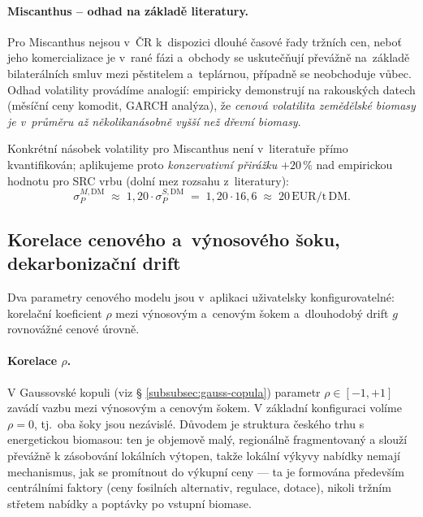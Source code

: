 \paragraph{Miscanthus -- odhad na základě literatury.}
Pro Miscanthus nejsou v~ČR k~dispozici dlouhé časové řady tržních cen,
neboť jeho komercializace je v~rané fázi a~obchody se uskutečňují
převážně na~základě bilaterálních smluv mezi pěstitelem a~teplárnou, případně se neobchoduje vůbec.
Odhad volatility provádíme analogií: \citet{Kristoefel2014} empiricky
demonstrují na rakouských datech (měsíční ceny komodit, GARCH analýza),
že \emph{cenová volatilita zemědělské biomasy je v~průměru až několikanásobně
vyšší než dřevní biomasy}.

Konkrétní násobek volatility pro Miscanthus není v~literatuře přímo
kvantifikován; aplikujeme proto \emph{konzervativní přirážku}
$+20\,\%$ nad empirickou hodnotu pro SRC vrbu (dolní mez rozsahu z~literatury):
\begin{equation}
\sigma_P^{M,\mathrm{DM}} \;\approx\; 1{,}20 \cdot \sigma_P^{S,\mathrm{DM}}
\;=\; 1{,}20 \cdot 16,6 \;\approx\; 20\,\mathrm{EUR/t\,DM}.
\label{eq:sigma_M}
\end{equation}



\subsection{Korelace cenového a~výnosového šoku, dekarbonizační drift}
\label{sec:korelace_drift}

Dva parametry cenového modelu jsou v~aplikaci uživatelsky
konfigurovatelné: korelační koeficient $\rho$ mezi výnosovým
a~cenovým šokem a~dlouhodobý drift $g$ rovnovážné cenové úrovně.

\paragraph{Korelace $\rho$.}
V Gaussovské kopuli (viz § \ref{subsubsec:gauss-copula}) parametr $\rho \in [-1, +1]$ 
zavádí vazbu mezi výnosovým a cenovým šokem. V základní konfiguraci 
volíme $\rho = 0$, tj.~oba šoky jsou nezávislé. Důvodem je struktura 
českého trhu s energetickou biomasou: ten je objemově malý, regionálně 
fragmentovaný a slouží převážně k zásobování lokálních výtopen, takže 
lokální výkyvy nabídky nemají mechanismus, jak se promítnout do výkupní 
ceny --- ta je formována především centrálními faktory (ceny fosilních 
alternativ, regulace, dotace), nikoli tržním střetem nabídky a poptávky 
po vstupní biomase.

